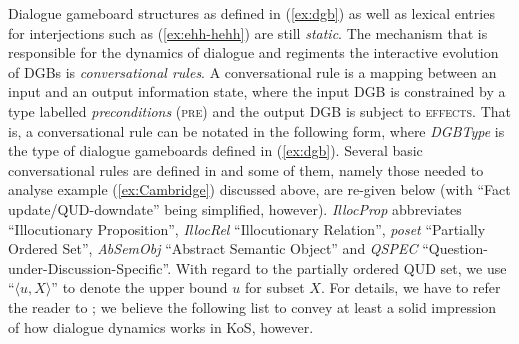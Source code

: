 \documentclass[output=paper
 	        ,biblatex
                ,babelshorthands
                ,newtxmath
                ,draftmode
                ,colorlinks, citecolor=brown
]{langscibook}
\begin{document}
Dialogue gameboard structures as defined in (\ref{ex:dgb}) as well as lexical entries for interjections such as (\ref{ex:ehh-hehh}) are still \emph{static}.
%
The mechanism that is responsible for the dynamics of dialogue and regiments the interactive evolution of DGBs is \emph{conversational rules}.
%
A conversational rule is a mapping between an input and an output information state, where the input DGB is constrained by a type labelled \emph{preconditions} (\textsc{pre}) and the output DGB is subject to \textsc{effects}.
%
That is, a conversational rule can be notated in the following form, where \emph{DGBType} is the type of dialogue gameboards defined in (\ref{ex:dgb}).
%
\ea \label{ex:pre-effect}
\z
%
Several basic conversational rules are defined in \citet[Chapter~4]{Ginzburg:2012} and some of them, namely those needed to analyse example (\ref{ex:Cambridge}) discussed above, are re-given below (with \enquote{Fact update/QUD-downdate} being simplified, however).
%
\textit{IllocProp} abbreviates \enquote{Illocutionary Proposition}, \textit{IllocRel} \enquote{Illocutionary Relation}, \textit{poset} \enquote{Partially Ordered Set}, \textit{AbSemObj} \enquote{Abstract Semantic Object} and \textit{QSPEC} \enquote{Question-under-Discussion-Specific}.
%
With regard to the partially ordered QUD set, we use \enquote{$\langle u, X\rangle$} to denote the upper bound $u$ for subset $X$.
%
For details, we have to refer the reader to \citet{Ginzburg:2012}; we believe the following list to convey at least a solid impression of how dialogue dynamics works in KoS, however.
%
\end{document}

